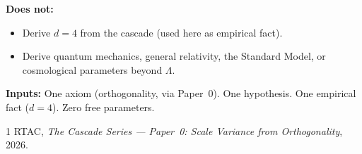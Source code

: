 \documentclass[11pt,a4paper]{article}
\begin{document}
\textbf{Does not:}
\begin{itemize}
\item Derive $d = 4$ from the cascade (used here as empirical fact).
\item Derive quantum mechanics, general relativity, the Standard Model, or
cosmological parameters beyond $\Lambda$.
\end{itemize}

\textbf{Inputs:} One axiom (orthogonality, via Paper~0). One hypothesis.
One empirical fact ($d = 4$). Zero free parameters.

\begin{thebibliography}{1}
 RTAC, \textit{The Cascade Series --- Paper~0: Scale
Variance from Orthogonality}, 2026.
\end{thebibliography}
\end{document}
